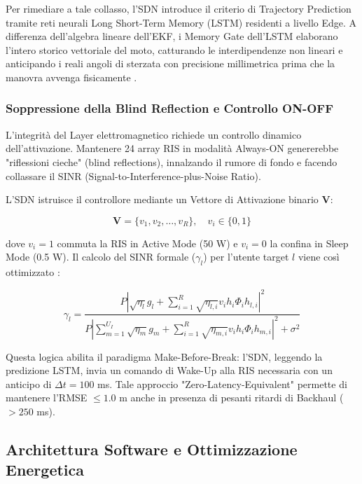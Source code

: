\documentclass[twoside]{article}
\begin{document}
Per rimediare a tale collasso, l'SDN introduce il criterio di Trajectory Prediction tramite reti neurali Long Short-Term Memory (LSTM) residenti a livello Edge. A differenza dell'algebra lineare dell'EKF, i Memory Gate dell'LSTM elaborano l'intero storico vettoriale del moto, catturando le interdipendenze non lineari e anticipando i reali angoli di sterzata con precisione millimetrica prima che la manovra avvenga fisicamente \cite{Zhang2022}.

\subsubsection{Soppressione della Blind Reflection e Controllo ON-OFF}

L'integrità del Layer elettromagnetico richiede un controllo dinamico dell'attivazione. Mantenere 24 array RIS in modalità Always-ON genererebbe "riflessioni cieche" (blind reflections), innalzando il rumore di fondo e facendo collassare il SINR (Signal-to-Interference-plus-Noise Ratio).

L'SDN istruisce il controllore mediante un Vettore di Attivazione binario $\mathbf{V}$:

\begin{equation}
\mathbf{V} = \{v_1, v_2, \dots, v_R\}, \quad v_i \in \{0, 1\}
\label{eq:ris_activation_vector}
\end{equation}

dove $v_i = 1$ commuta la RIS in Active Mode (50 W) e $v_i = 0$ la confina in Sleep Mode (0.5 W). Il calcolo del SINR formale ($\gamma_l$) per l'utente target $l$ viene così ottimizzato \cite{Zhang2022}:

\begin{equation}
\gamma_l = \frac{P \left| \sqrt{\eta_l}g_l + \sum_{i=1}^{R} \sqrt{\eta_{l,i}} v_i h_i \Phi_i h_{l,i} \right|^2}{P \left| \sum_{m=1}^{U_I} \sqrt{\eta_m}g_m + \sum_{i=1}^{R} \sqrt{\eta_{m,i}} v_i h_i \Phi_i h_{m,i} \right|^2 + \sigma^2}
\label{eq:sinr_blind_reflection}
\end{equation}

Questa logica abilita il paradigma Make-Before-Break: l'SDN, leggendo la predizione LSTM, invia un comando di Wake-Up alla RIS necessaria con un anticipo di $\Delta t = 100$ ms. Tale approccio "Zero-Latency-Equivalent" permette di mantenere l'RMSE $\le 1.0$ m anche in presenza di pesanti ritardi di Backhaul ($> 250$ ms).
\subsection{Architettura Software e Ottimizzazione Energetica}
\end{document}
